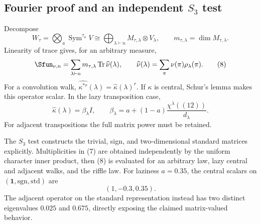 \documentclass[10pt]{article}
\newcommand{\Tr}{\operatorname{Tr}}
\begin{document}
\subsection{Fourier proof and an independent \texorpdfstring{$S_3$}{S3} test}
Decompose
\begin{equation}
W_\tau=\bigotimes_a\operatorname{Sym}^{\tau_a}V
\cong\bigoplus_{\lambda\vdash n}M_{\tau,\lambda}\otimes V_\lambda,
\qquad m_{\tau,\lambda}=\dim M_{\tau,\lambda}.            \tag{7}
\end{equation}
Linearity of trace gives, for an arbitrary measure,
\begin{equation}
[\mathbf t^\tau]\Sfun_{\nu,n}
=\sum_{\lambda\vdash n}m_{\tau,\lambda}
\Tr\widehat\nu(\lambda),
\qquad
\widehat\nu(\lambda)=\sum_\pi\nu(\pi)\rho_\lambda(\pi). \tag{8}
\end{equation}
For a convolution walk, $\widehat{\kappa^{*r}}(\lambda)
=\widehat\kappa(\lambda)^r$.  If $\kappa$ is central, Schur's lemma makes
this operator scalar.  In the lazy transposition case,
\begin{equation}
\widehat\kappa(\lambda)=\beta_\lambda I,
\qquad
\beta_\lambda=a+(1-a)\frac{\chi^\lambda((12))}{d_\lambda}. \tag{9}
\end{equation}
For adjacent transpositions the full matrix power must be retained.

The $S_3$ test constructs the trivial, sign, and two-dimensional standard
matrices explicitly.  Multiplicities in (7) are obtained independently by
the uniform character inner product, then (8) is evaluated for an arbitrary
law, lazy central and adjacent walks, and the riffle law.  For laziness
$a=0.35$, the central scalars on $(\mathbf1,\mathrm{sgn},\mathrm{std})$ are
\begin{equation}
(1,-0.3,0.35).                                               \tag{10}
\end{equation}
The adjacent operator on the standard representation instead has two distinct
eigenvalues $0.025$ and $0.675$, directly exposing the claimed matrix-valued
behavior.
\end{document}
